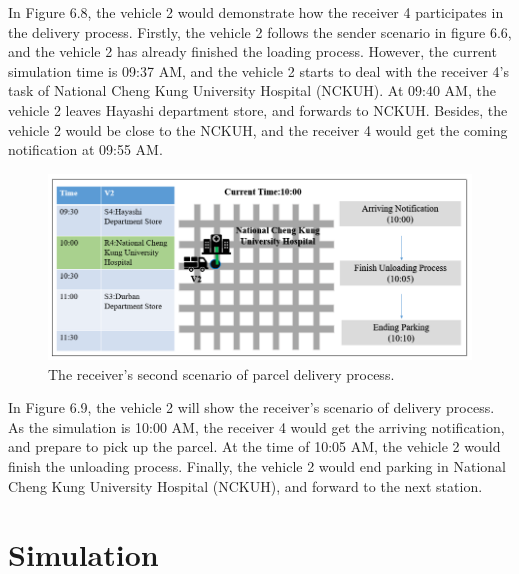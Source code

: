 \documentclass[12pt]{ksthesis}
\begin{document}
\begin{thesis}
{In Figure 6.8, the vehicle 2 would demonstrate how the receiver 4 participates in the delivery process. Firstly, the vehicle 2 follows the sender scenario in figure 6.6, and the vehicle 2 has already finished the loading process.
However, the current simulation time is 09:37 AM, and the vehicle 2 starts to deal with the receiver 4’s task of National Cheng Kung University Hospital (NCKUH). At 09:40 AM, the vehicle 2 leaves Hayashi department store, and forwards to NCKUH. Besides, the vehicle 2 would be close to the NCKUH, and the receiver 4 would get the coming notification at 09:55 AM.


\begin{figure}[t]
\centering
\includegraphics[width=1.0\textwidth]{./Thesis_figures/F6-9_receiverScenario2.PNG}
\caption{\large The receiver's second scenario of parcel delivery process.}
\vspace{0.5cm}
\label{Fig:Second_ReceiverScenario_DeliveryProcess}
\end{figure}

In Figure 6.9, the vehicle 2 will show the receiver’s scenario of delivery process. As the simulation is 10:00 AM, the receiver 4 would get the arriving notification, and prepare to pick up the parcel. At the time of 10:05 AM, the vehicle 2 would finish the unloading process. Finally, the vehicle 2 would end parking in National Cheng Kung University Hospital (NCKUH), and forward to the next station.








\chapter{Simulation}\label{Chap:Simulation}

}
\end{thesis}
\end{document}
